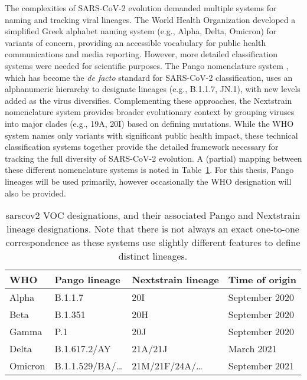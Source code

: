The complexities of SARS-CoV-2 evolution demanded multiple systems for naming and tracking viral lineages.
The World Health Organization developed a simplified Greek alphabet naming system (e.g., Alpha, Delta, Omicron) for variants of concern, providing an accessible vocabulary for public health communications and media reporting.
However, more detailed classification systems were needed for scientific purposes.
The Pango nomenclature system \citep{rambaut2020dynamic,o2021assignment,o2022pango}, which has become the \textit{de facto} standard for SARS-CoV-2 classification, uses an alphanumeric hierarchy to designate lineages (e.g., B.1.1.7, JN.1), with new levels added as the virus diversifies.
Complementing these approaches, the Nextstrain \citep{hadfield2018nextstrain,aksamentov2021nextclade} nomenclature system provides broader evolutionary context by grouping viruses into major clades (e.g., 19A, 20I) based on defining mutations.
While the WHO system names only variants with significant public health impact, these technical classification systems together provide the detailed framework necessary for tracking the full diversity of SARS-CoV-2 evolution.
A (partial) mapping between these different nomenclature systems is noted in Table~\ref{tab:variants}.
For this thesis, Pango lineages will be used primarily, however occasionally the WHO designation will also be provided.

\begin{table}[]
  \begin{tabular}{llll}
  \hline
  \textbf{WHO} & \textbf{Pango lineage} & \textbf{Nextstrain lineage} & \textbf{Time of origin} \\ \hline
  Alpha        & B.1.1.7                & 20I                         & September 2020          \\
  Beta         & B.1.351                & 20H                         & September 2020          \\
  Gamma        & P.1                    & 20J                         & September 2020          \\
  Delta        & B.1.617.2/AY           & 21A/21J                     & March 2021              \\
  Omicron      & B.1.1.529/BA/\ldots    & 21M/21F/24A/\ldots          & September 2021          \\
  \end{tabular}
  \caption{\gls{sarscov2} VOC designations, and their associated Pango and Nextstrain lineage designations. Note that there is not always an exact one-to-one correspondence as these systems use slightly different features to define distinct lineages.}
  \label{tab:variants}
\end{table}


